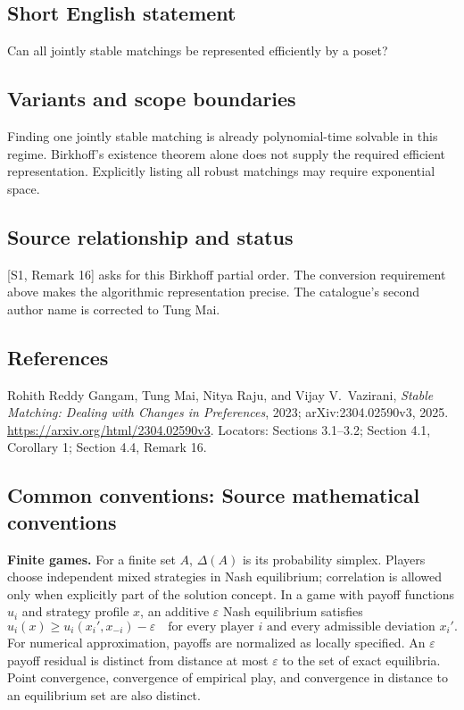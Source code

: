 \documentclass[11pt,a4paper]{article}
\begin{document}
\subsection*{Short English statement}
Can all jointly stable matchings be represented efficiently by a poset?

\subsection*{Variants and scope boundaries}
Finding one jointly stable matching is already polynomial-time solvable
in this regime. Birkhoff's existence theorem alone does not supply the
required efficient representation. Explicitly listing all robust
matchings may require exponential space.

\subsection*{Source relationship and status}
[S1, Remark 16] asks for this Birkhoff partial order. The conversion
requirement above makes the algorithmic representation precise.
The catalogue's second author name is corrected to Tung Mai.

\subsection*{References}
\begingroup\footnotesize\raggedright
\noindent[S1] Rohith Reddy Gangam, Tung Mai, Nitya Raju, and
Vijay V.~Vazirani,
\emph{Stable Matching: Dealing with Changes in Preferences}, 2023;
arXiv:2304.02590v3, 2025.
\url{https://arxiv.org/html/2304.02590v3}.
Locators: Sections 3.1--3.2; Section 4.1, Corollary 1;
Section 4.4, Remark 16.
\par\endgroup

\subsection*{Common conventions: Source mathematical conventions}

\textbf{Finite games.} For a finite set $A$, $\Delta(A)$ is its probability
simplex. Players choose independent mixed strategies in Nash equilibrium;
correlation is allowed only when explicitly part of the solution concept.
In a game with payoff functions $u_i$ and strategy profile $x$, an additive
$\varepsilon$ Nash equilibrium satisfies
\[
 u_i(x)\geq u_i(x_i',x_{-i})-\varepsilon
 \quad\text{for every player $i$ and every admissible deviation $x_i'$}.
\]
For numerical approximation, payoffs are normalized as locally specified.
An $\varepsilon$ payoff residual is distinct from distance at most
$\varepsilon$ to the set of exact equilibria. Point convergence, convergence
of empirical play, and convergence in distance to an equilibrium set are
also distinct.
\end{document}
